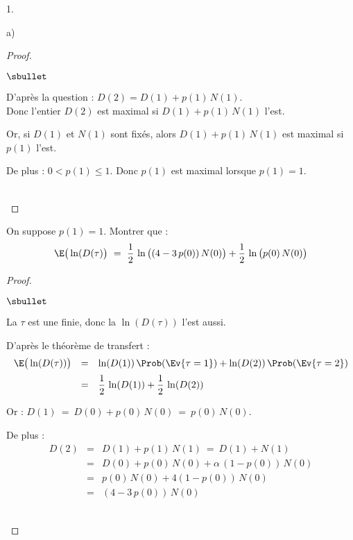 \begin{noliste}{1.}
\begin{noliste}{a)}
    \begin{proof}~
     \begin{noliste}{$\sbullet$}
      \item D'après la question  : $D(2) = D(1) + p(1) \, 
      N(1)$.\\
      Donc l'entier $D(2)$ est maximal si $D(1)+p(1) \, N(1)$ l'est.
      
      \item Or, si $D(1)$ et $N(1)$ sont fixés, alors $D(1)+p(1) \, 
      N(1)$ est maximal si $p(1)$ l'est.
      
      \item De plus : $0< p(1) \leq 1$. Donc $p(1)$ est maximal 
      lorsque $p(1)=1$.
     \end{noliste}
     ~\\[-1cm]
    \end{proof}

    
    \item On suppose $p(1)=1$. Montrer que :
    \[
      \E\big(\ln(D(\tau)\big) \ = \ \dfrac{1}{2} \, \ln\big((4-3 \, 
      p(0)) \, N(0)\big) + \dfrac{1}{2} \, \ln\big(p(0) \, N(0)\big)
    \]
    
    \begin{proof}~
      \begin{noliste}{$\sbullet$}
	\item La \var $\tau$ est une \var finie, donc la \var $\ln(
	D(\tau))$ l'est aussi.
	
	\item D'après le théorème de transfert :
	\[
	  \begin{array}{rcl}
	    \E\big(\ln(D(\tau))\big) &=& \ln(D(1)) \, \Prob(\Ev{\tau
	    =1}) + \ln(D(2)) \, \Prob(\Ev{\tau =2})
	    \\[.2cm]
	    &=& \dfrac{1}{2} \, \ln(D(1)) + \dfrac{1}{2} \, \ln(D(2))
	  \end{array}
	\]
	
	\item Or : $D(1) \ = \ D(0) + p(0) \, N(0) \ = \ p(0) \, N(0)$.
	
	\item De plus : 
	\[
	  \begin{array}{rcl}
	    D(2) &=& D(1) + p(1) \, N(1) \ = \ D(1) + N(1)
	    \\[.2cm]
	    &=& D(0) + p(0) \, N(0) + \alpha \, (1-p(0)) \, N(0)
	    \\[.2cm]
	    &=& p(0) \, N(0) + 4(1-p(0)) \, N(0)
	    \\[.2cm]
	    &=& (4-3 \, p(0)) \, N(0)
	  \end{array}
	\]
      \end{noliste}
      ~\\[-1cm]
    \end{proof}
    

\end{noliste}
\end{noliste}
